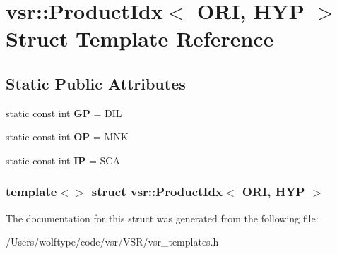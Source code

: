 \hypertarget{structvsr_1_1_product_idx_3_01_o_r_i_00_01_h_y_p_01_4}{\section{vsr\-:\-:Product\-Idx$<$ O\-R\-I, H\-Y\-P $>$ Struct Template Reference}
\label{structvsr_1_1_product_idx_3_01_o_r_i_00_01_h_y_p_01_4}
}
\subsection*{Static Public Attributes}
\begin{DoxyCompactItemize}
\item 
\hypertarget{structvsr_1_1_product_idx_3_01_o_r_i_00_01_h_y_p_01_4_aa27354c3fbe58fd77d33f8bb750112c4}{static const int {\bfseries G\-P} = D\-I\-L}\label{structvsr_1_1_product_idx_3_01_o_r_i_00_01_h_y_p_01_4_aa27354c3fbe58fd77d33f8bb750112c4}

\item 
\hypertarget{structvsr_1_1_product_idx_3_01_o_r_i_00_01_h_y_p_01_4_ac3256c0dbccf5a806dd617e951c65eaa}{static const int {\bfseries O\-P} = M\-N\-K}\label{structvsr_1_1_product_idx_3_01_o_r_i_00_01_h_y_p_01_4_ac3256c0dbccf5a806dd617e951c65eaa}

\item 
\hypertarget{structvsr_1_1_product_idx_3_01_o_r_i_00_01_h_y_p_01_4_a83d80f2a9da0df6ee72c71d72bfdda43}{static const int {\bfseries I\-P} = S\-C\-A}\label{structvsr_1_1_product_idx_3_01_o_r_i_00_01_h_y_p_01_4_a83d80f2a9da0df6ee72c71d72bfdda43}

\end{DoxyCompactItemize}
\subsubsection*{template$<$$>$ struct vsr\-::\-Product\-Idx$<$ O\-R\-I, H\-Y\-P $>$}



The documentation for this struct was generated from the following file\-:\begin{DoxyCompactItemize}
\item 
/\-Users/wolftype/code/vsr/\-V\-S\-R/vsr\-\_\-templates.\-h\end{DoxyCompactItemize}
